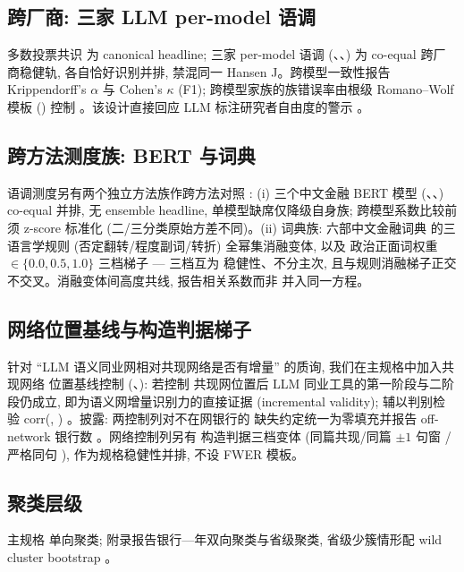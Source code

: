 \subsection{跨厂商: 三家 LLM per-model 语调}
多数投票共识  为 canonical headline; 三家 per-model 语调
(、、) 为 co-equal
跨厂商稳健轨, 各自恰好识别并排, 禁混同一 Hansen J。跨模型一致性报告
Krippendorff's $\alpha$ 与 Cohen's $\kappa$ (F1); 跨模型家族的族错误率由根级
Romano--Wolf 模板 () 控制
\parencite{romano2005stepdown}。该设计直接回应 LLM 标注研究者自由度的警示
\parencite{baumann2025llmhacking,ludwig2025llmframework}。

\subsection{跨方法测度族: BERT 与词典}
语调测度另有两个独立方法族作跨方法对照 \parencite{shapiro2022newssentiment,hansen2023fedspeak}:
(i) 三个中文金融 BERT 模型 (、、)
co-equal 并排, 无 ensemble headline, 单模型缺席仅降级自身族; 跨模型系数比较前须
z-score 标准化 (二/三分类原始方差不同)。(ii) 词典族: 六部中文金融词典
\parencite{du2022chinesedict} 的三语言学规则 (否定翻转/程度副词/转折) 全幂集消融变体,
以及  政治正面词权重 $\in \{0.0, 0.5, 1.0\}$ 三档梯子 --- 三档互为
稳健性、不分主次, 且与规则消融梯子正交不交叉。消融变体间高度共线, 报告相关系数而非
并入同一方程。

\subsection{网络位置基线与构造判据梯子}
针对 ``LLM 语义同业网相对共现网络是否有增量'' 的质询, 我们在主规格中加入共现网络
位置基线控制 (、): 若控制
共现网位置后 LLM 同业工具的第一阶段与二阶段仍成立, 即为语义网增量识别力的直接证据
(incremental validity); 辅以判别检验 corr(,
) 。披露: 两控制列对不在网银行的
缺失约定统一为零填充并报告 off-network 银行数 。网络控制列另有
构造判据三档变体 (同篇共现/同篇 $\pm 1$ 句窗 /严格同句 ),
作为规格稳健性并排, 不设 FWER 模板。

\subsection{聚类层级}
主规格  单向聚类; 附录报告银行—年双向聚类与省级聚类, 省级少簇情形配
wild cluster bootstrap \parencite{mackinnon2023cluster,cameron2015practitioner}。

